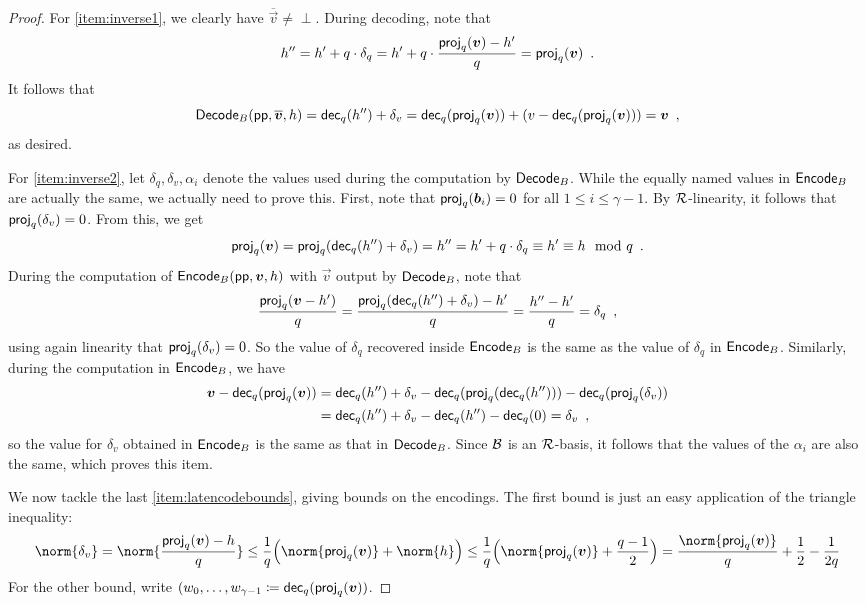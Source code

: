 \begin{lemma}
\begin{proof}
For \autoref{item:inverse1}, we clearly have $\overline{\vec{v}} \neq \perp$. During decoding, note that
\[
 h'' = h' + q\cdot\delta_q = h'+q\cdot\frac{\mathsf{proj}_q(\boldsymbol{v})-h'}{q} = \mathsf{proj}_q(\boldsymbol{v})\enspace.
\]
It follows that
\[
 \mathsf{Decode}_B(\mathsf{pp},\overline{\boldsymbol{v}}, h) = \mathsf{dec}_q(h'') + \delta_v = \mathsf{dec}_q(\mathsf{proj}_q(\boldsymbol{v})) + (v - \mathsf{dec}_q(\mathsf{proj}_q(\boldsymbol{v}))) = \boldsymbol{v}\enspace,
\]
as desired.

For \autoref{item:inverse2}, let $\delta_q, \delta_v, \alpha_i$ denote the values used during the computation by $\mathsf{Decode}_B$.
While the equally named values in $\mathsf{Encode}_B$ are actually the same, we actually need to prove this.
First, note that $\mathsf{proj}_q(\boldsymbol{b}_i) = 0$ for all $1\leq i \leq \gamma-1$.
By $\mathcal{R}$-linearity, it follows that $\mathsf{proj}_q(\delta_v) = 0$. From this, we get
\[
 \mathsf{proj}_q(\boldsymbol{v}) = \mathsf{proj}_q(\mathsf{dec}_q(h'') + \delta_v) = h'' = h' + q\cdot \delta_q \equiv h' \equiv h \mod q\enspace.
\]
During the computation of $\mathsf{Encode}_B(\mathsf{pp}, \boldsymbol{v}, h)$ with $\vec{v}$ output by $\mathsf{Decode}_B$, note that
\[
 \frac{\mathsf{proj}_q(\boldsymbol{v} - h')}{q} = \frac{\mathsf{proj}_q(\mathsf{dec}_q(h'')+\delta_v)-h'}{q} = \frac{h''-h'}{q} = \delta_q\enspace,
\]
using again linearity that $\mathsf{proj}_q(\delta_v) = 0$. So the value of $\delta_q$ recovered inside $\mathsf{Encode}_B$ is the same as the value of $\delta_q$ in $\mathsf{Encode}_B$.
Similarly, during the computation in $\mathsf{Encode}_B$, we have
\begin{align*}
 \boldsymbol{v}-\mathsf{dec}_q(\mathsf{proj}_q(\boldsymbol{v})) &= \mathsf{dec}_q(h'') + \delta_v - \mathsf{dec}_q(\mathsf{proj}_q(\mathsf{dec}_q(h''))) - \mathsf{dec}_q(\mathsf{proj}_q(\delta_v))\\
 {}&=\mathsf{dec}_q(h'') + \delta_v - \mathsf{dec}_q(h'') - \mathsf{dec}_q(0) = \delta_v\enspace,
\end{align*}
so the value for $\delta_v$ obtained in $\mathsf{Encode}_B$ is the same as that in $\mathsf{Decode}_B$.
Since $\mathcal{B}$ is an $\mathcal{R}$-basis, it follows that the values of the $\alpha_i$ are also the same, which proves this item.

We now tackle the last \autoref{item:latencodebounds}, giving bounds on the encodings.
The first bound is just an easy application of the triangle inequality:
\[
 \norm{\delta_v} = \norm{ \frac{\proj_q(\vec{v}) - h}{q}} \leq \frac{1}{q} \Bigl( \norm{\proj_q(\vec{v})} + \norm{h}\Bigr)
 \leq \frac{1}{q}\Bigl(\norm{\proj_q(\vec{v})} + \frac{q-1}{2}\Bigr)
 = \frac{\norm{\proj_q(\vec{v})}}{q} + \frac{1}{2} - \frac{1}{2q}
\]
For the other bound, write $(w_0,\ldots, w_{\gamma-1} \coloneqq \mathsf{dec}_q(\mathsf{proj}_q(\boldsymbol{v}))$.



\end{proof}
\end{lemma}


